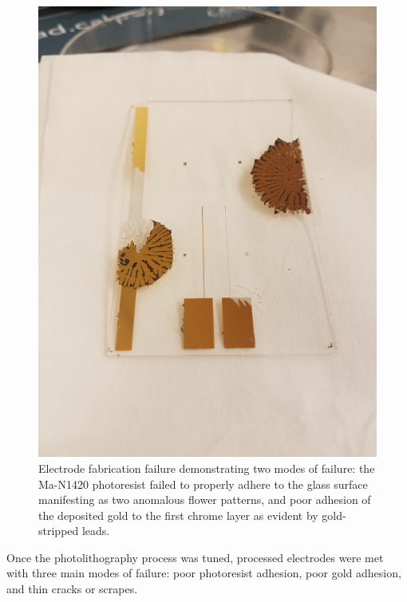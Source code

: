 \begin{figure}[h]
    \centering
    \includegraphics[width=\textwidth]{images/adhesion_issues.jpg}
    \caption{Electrode fabrication failure demonstrating two modes of failure: the Ma-N1420 photoresist failed to properly adhere to the glass surface manifesting as two anomalous flower patterns, and poor adhesion of the deposited gold to the first chrome layer as evident by gold-stripped leads.}
    \label{fig:failed_electrode_macro}
\end{figure}

\par Once the photolithography process was tuned, processed electrodes were met with three main modes of failure: poor photoresist adhesion, poor gold adhesion, and thin cracks or scrapes. 

